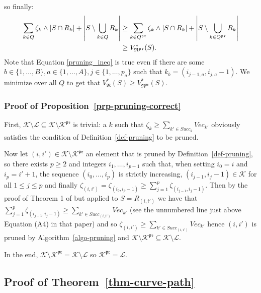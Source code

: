 \documentclass[
  11pt,
  a4paper,
]{article}
\theoremstyle{plain}
\theoremstyle{plain}
\theoremstyle{definition}
\theoremstyle{plain}
\theoremstyle{definition}
\theoremstyle{remark}
\begin{document}
so finally: \begin{align}
\sum_{k\in Q}\zeta_k\wedge|S\cap R_k|+\left| S\setminus\bigcup_{k\in Q} R_k   \right| &\geq \sum_{k\in Q^{\mathfrak{pr}}}\zeta_k\wedge|S\cap R_k|+\left| S\setminus\bigcup_{k\in Q^{\mathfrak{pr}}} R_k   \right|   \label{pruning_ineq}\\
&\geq V^*_{\mathfrak{R}^{\mathfrak{pr}}}(S). \notag
\end{align} Note that Equation \eqref{pruning_ineq} is true even if
there are some
\(b\in\{ 1,\dotsc,B\}, a\in\{ 1,\dotsc,A\}, j\in\{ 1,\dotsc,p_a\}\) such
that \(k_b=(i_{j-1,a}, i_{j,a}-1)\). We minimize over all \(Q\) to get
that
\(V^*_{\mathfrak{R}}(S)\geq V^*_{\mathfrak{R}^{\mathfrak{pr}}}(S)\).

\subsubsection{\texorpdfstring{Proof of
Proposition~\ref{prp-pruning-correct}}{Proof of Proposition~}}\label{sec-pruning-proofs-pruning-correct}

First,
\(\mathcal{K}\setminus\mathcal{L}\subseteq\mathcal{K}\setminus\mathcal{K}^{\mathfrak{pr}}\)
is trivial: a \(k\) such that
\(\zeta_{k} \geq  \sum_{k'\in Succ_k} Vec_{k'}\) obviously satisfies the
condition of Definition~\ref{def-pruning} to be pruned.

Now let \((i,i')\in \mathcal{K}\setminus\mathcal{K}^{\mathfrak{pr}}\) an
element that is pruned by Definition~\ref{def-pruning}, so there exists
\(p\geq2\) and integers \(i_1,\dotsc,i_{p-1}\) such that, when setting
\(i_0=i\) and \(i_{p}=i'+1\), the sequence \((i_0,\dotsc,i_{p})\) is
strictly increasing, \((i_{j-1},i_{j}-1)\in\mathcal{K}\) for all
\(1\leq j\leq p\) and finally
\(\zeta_{(i,i')}=\zeta_{(i_0,i_{p}-1)}\geq \sum_{j=1}^{p} \zeta_{(i_{j-1}, i_{j}-1)}\).
Then by the proof of Theorem 1 of \citet{MR4178188} but applied to
\(S=R_{(i,i')}\) we have that
\(\sum_{j=1}^{p} \zeta_{(i_{j-1}, i_{j}-1)}\geq  \sum_{k'\in Succ_{(i,i')}} Vec_{k'}\)
(see the unnumbered line just above Equation (A4) in that paper) and so
\(\zeta_{(i,i')}\geq \sum_{k'\in Succ_{(i,i')}} Vec_{k'}\) hence
\((i,i')\) is pruned by Algorithm~\ref{algo-pruning} and
\(\mathcal{K}\setminus\mathcal{K}^{\mathfrak{pr}}\subseteq\mathcal{K}\setminus\mathcal{L}\).

In the end,
\(\mathcal{K}\setminus\mathcal{K}^{\mathfrak{pr}}=\mathcal{K}\setminus\mathcal{L}\)
so \(\mathcal{K}^{\mathfrak{pr}}=\mathcal{L}\).

\subsection{\texorpdfstring{Proof of
Theorem~\ref{thm-curve-path}}{Proof of Theorem~}}\label{sec-proof}
\end{document}
